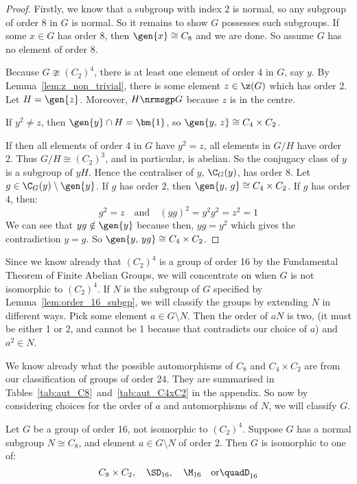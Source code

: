 \begin{proof}
    Firstly, we know that a subgroup with index 2 is normal, so any subgroup of order 8 in \(G\) is normal.
    So it remains to show \(G\) possesses such subgroups.
    If some \(x \in G\) has order 8, then \(\gen{x} \cong C_8\) and we are done.
    So assume \(G\) has no element of order 8.

    Because \(G \ncong {(C_2)}^4\), there is at least one element of order 4 in \(G\), say \(y\).
    By Lemma~\ref{lem:z_non_trivial}, there is some element \(z \in \z(G)\) which has order 2.
    Let \(H = \gen{z}\).
    Moreover, \(H \nrmsgp G\) because \(z\) is in the centre.

    If \(y^2 \neq z\), then \(\gen{y} \cap H = \bm{1}\), so \(\gen{y,\,z} \cong C_4 \times C_2\).

    If then all elements of order 4 in \(G\) have \(y^2 = z\), all elements in \(G/H\) have order 2.
    Thus \(G/H \cong {(C_2)}^3\), and in particular, is abelian.
    So the conjugacy class of \(y\) is a subgroup of \(yH\).
    Hence the centraliser of \(y\), \(\C_G(y)\), has order 8.
    Let \(g \in \C_G(y) \setminus \gen{y}\).
    If \(g\) has order 2, then \(\gen{y,\,g} \cong C_4 \times C_2\).
    If \(g\) has order 4, then:
    \[g^2 = z \quad \text{and} \quad {(yg)}^2 = y^2 g^2 = z^2 = 1\]
    We can see that \(yg \notin \gen{y}\) because then, \(yg = y^2\) which gives the contradiction \(y = g\).
    So \(\gen{y,\,yg} \cong C_4 \times C_2\).
\end{proof}

Since we know already that \({(C_2)}^4\) is a group of order 16 by the Fundamental Theorem of Finite Abelian Groups, we
will concentrate on when \(G\) is not isomorphic to \({(C_2)}^4\).
If \(N\) is the subgroup of \(G\) specified by Lemma~\ref{lem:order_16_subgp}, we will classify the groups by extending
\(N\) in different ways.
Pick some element \(a \in G \setminus N\).
Then the order of \(aN\) is two, (it must be either 1 or 2, and cannot be 1 because that contradicts our choice of
\(a\)) and \(a^2 {\in} N\).

We know already what the possible automorphisms of \(C_8\) and \(C_4 \times C_2\) are from our classification of groups
of order 24.
They are summarised in Tables~\ref{tab:aut_C8}~and~\ref{tab:aut_C4xC2} in the appendix.
So now by considering choices for the order of \(a\) and automorphisms of \(N\), we will classify \(G\).

\begin{lemma}
    Let \(G\) be a group of order 16, not isomorphic to \({(C_{2})}^4\).
    Suppose \(G\) has a normal subgroup \(N \cong C_8\), and element \(a \in G\setminus N\) of order 2.
    Then \(G\) is isomorphic to one of:
    \[
        C_8 \times C_2, \quad%
        \SD_{16}, \quad%
        \M_{16} \quad \text{or} \quad%
        D_{16}
    \]
\end{lemma}

